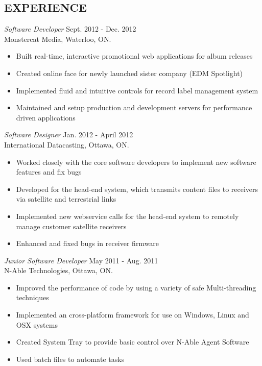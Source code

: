 \documentclass[margin]{res}
\begin{document}
\begin{resume}
\section{EXPERIENCE}
{\sl Software Developer} \hfill Sept. 2012 - Dec. 2012 \\
Monstercat Media, Waterloo, ON.
\begin{itemize}  \itemsep -2pt %
  \item Built real-time, interactive promotional web applications for album releases
  \item Created online face for newly launched sister company (EDM Spotlight)
  \item Implemented fluid and intuitive controls for record label management system
  \item Maintained and setup production and development servers for performance driven applications
\end{itemize}

{\sl Software Designer} \hfill Jan. 2012 - April 2012 \\
International Datacasting, Ottawa, ON.
\begin{itemize}  \itemsep -2pt %
  \item Worked closely with the core software developers to implement new software features and fix bugs
  \item Developed for the head-end system, which transmits content files to receivers via satellite and terrestrial links
  \item Implemented new webservice calls for the head-end system to remotely manage customer satellite receivers
  \item Enhanced and fixed bugs in receiver firmware
\end{itemize}

{\sl Junior Software Developer} \hfill May 2011 - Aug. 2011 \\
N-Able Technologies, Ottawa, ON.
\begin{itemize} \itemsep -2pt
  \item Improved the performance of code by using a variety of safe Multi-threading techniques
  \item Implemented an cross-platform framework for use on Windows, Linux and OSX systems
  \item  Created System Tray to provide basic control over N-Able Agent Software
  \item Used batch files to automate tasks
\end{itemize}


\end{resume}
\end{document}
